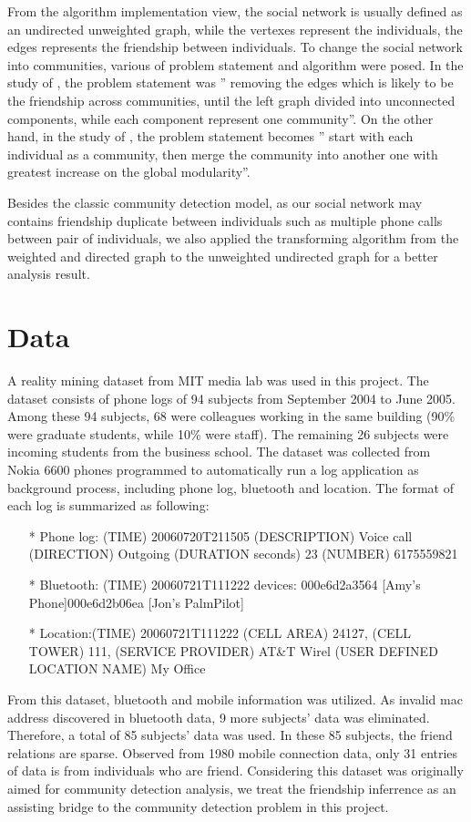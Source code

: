 \documentclass[11pt]{article}
\begin{document}
From the algorithm implementation view, the social network is usually defined as an undirected unweighted graph, while the vertexes represent the individuals, the edges represents the friendship between individuals. To change the social network into communities, various of problem statement and algorithm were posed. In the study of \cite{girvan_community_2002}, the problem statement was '' removing the edges which is likely to be the friendship across communities, until the left graph divided into unconnected components, while each component represent one community''. On the other hand, in the study of  \cite{newman_fast_2004}, the problem statement becomes '' start with each individual as a community, then merge the community into another one with greatest increase on the global modularity''.

Besides the classic community detection model, as our social network may contains friendship duplicate between individuals such as multiple phone calls between pair of individuals, we also applied the transforming algorithm from the weighted and directed graph to the unweighted undirected graph for a better analysis result.

\section{Data} \label{Data}
A reality mining dataset from MIT media lab \cite{eagle_inferring_2009} was used in this project. The dataset consists of phone logs of 94 subjects from September 2004 to June 2005. Among these 94 subjects, 68 were colleagues working in the same building (90\% were graduate students, while 10\% were staff). The remaining 26 subjects were incoming students from the business school. The dataset was collected from Nokia 6600 phones programmed to automatically run a log application as background process, including phone log, bluetooth and location. The format of each log is summarized as following:
\begin{itemize}
\item[*]
Phone log: (TIME)  20060720T211505  (DESCRIPTION)  Voice  call  (DIRECTION)  Outgoing  (DURATION 
seconds) 23 (NUMBER) 6175559821
\item[*]
Bluetooth: (TIME) 20060721T111222 devices: 000e6d2a3564 [Amy’s Phone]000e6d2b06ea [Jon’s PalmPilot] 
\item[*]
Location:(TIME) 20060721T111222 (CELL AREA) 24127, (CELL TOWER) 111, (SERVICE PROVIDER) AT\&T 
Wirel (USER DEFINED LOCATION NAME) My Office
\end{itemize}
From this dataset, bluetooth and mobile information was utilized. As invalid mac address discovered in bluetooth data, 9 more subjects' data was eliminated. Therefore, a total of 85 subjects' data was used. In these 85 subjects, the friend relations are sparse. Observed from 1980 mobile connection data, only 31 entries of data is from individuals who are friend. Considering this dataset was originally aimed for community detection analysis, we treat the friendship inferrence as an assisting bridge to the community detection problem in this project. 
\end{document}
